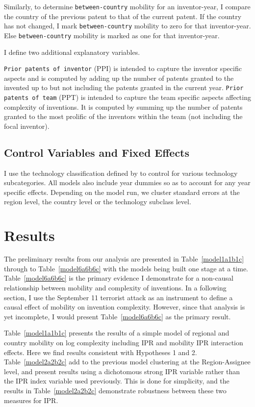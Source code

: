 \documentclass[12pt]{article}
\begin{document}
Similarly, to determine \texttt{between-country} mobility for an inventor-year,  I  compare the country  of the previous patent to that of the current patent. If the country has not changed, I mark \texttt{between-country} mobility to zero for that inventor-year. Else \texttt{between-country} mobility is marked as one for that inventor-year.\par

I define two additional explanatory variables. \par
\texttt{Prior patents of inventor} (PPI) is intended to capture the inventor specific aspects and is computed by adding up the number of patents granted to the invented up to but not including the patents granted in the current year. \texttt{Prior patents of team} (PPT) is intended to capture the team specific aspects affecting complexity of inventions. It is computed by summing up the number of patents granted to the most prolific of the inventors within the team (not including the focal inventor).

\subsection{Control Variables and Fixed Effects}
I use the technology classification defined by  \cite{Hall2001} to control for various technology subcategories. All models also include  year dummies so as to account for any year specific effects. Depending on the model run, we cluster standard errors at the region level, the country level or the technology subclass level.

\section{Results}

The preliminary results from our analysis are presented in Table~\ref{model1a1b1c} through to Table~\ref{model6a6b6c} with the models being built one stage at a time.  Table~\ref{model6a6b6c} is the primary evidence I demonstrate for a non-causal relationship between mobility and complexity of inventions. In a following section, I use the September 11 terrorist attack as an instrument to define a causal effect of mobility on invention complexity. However, since that analysis is yet incomplete, I would present Table~\ref{model6a6b6c} as the primary result.

Table~\ref{model1a1b1c} presents the results of a simple model of regional and country mobility on log complexity including IPR and mobility IPR interaction effects. Here we find results consistent with Hypotheses 1 and 2. Table~\ref{model2a2b2c} add to the previous model clustering at the Region-Assignee level, and present results using a dichotomous strong IPR variable rather than the IPR index variable used previously. This is done for simplicity, and the results in Table~\ref{model2a2b2c} demonstrate robustness between these two measures for IPR. 
\end{document}
